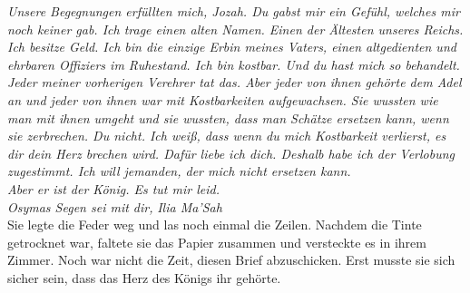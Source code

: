\textit{Unsere Begegnungen erfüllten mich, Jozah. Du gabst mir ein Gefühl, welches mir noch keiner 
gab. Ich trage einen alten Namen. Einen der Ältesten unseres Reichs. Ich besitze Geld. Ich bin die 
einzige Erbin meines Vaters, einen altgedienten und ehrbaren Offiziers im Ruhestand. Ich bin 
kostbar. Und du hast mich so behandelt. Jeder meiner vorherigen Verehrer tat das. Aber jeder von 
ihnen gehörte dem Adel an und jeder von ihnen war mit Kostbarkeiten aufgewachsen. Sie wussten wie 
man mit ihnen umgeht und sie wussten, dass man Schätze ersetzen kann, wenn sie zerbrechen. Du 
nicht. Ich weiß, dass wenn du mich Kostbarkeit verlierst, es dir dein Herz brechen wird. Dafür 
liebe ich dich. Deshalb habe ich der Verlobung zugestimmt. Ich will jemanden, der mich nicht 
ersetzen kann.\\}
\textit{Aber er ist der König. Es tut mir leid.}\\

\textit{Osymas Segen sei mit dir,}
\textit{Ilia Ma'Sah}\\

Sie legte die Feder weg und las noch einmal die Zeilen. Nachdem die Tinte getrocknet war, faltete 
sie das Papier zusammen und versteckte es in ihrem Zimmer. Noch war nicht die Zeit, diesen Brief 
abzuschicken. Erst musste sie sich sicher sein, dass das Herz des Königs ihr gehörte.
